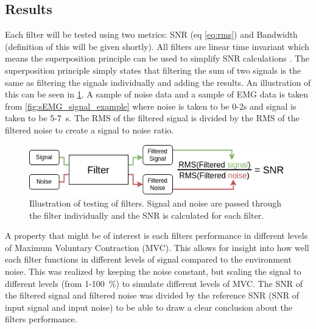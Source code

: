 \subsection{Results}
Each filter will be tested using two metrics: SNR (eq \ref{eq:rms}) and Bandwidth (definition of this will be given shortly). All filters are linear time invariant which means the superposition principle can be used to simplify SNR calculations \cite{linear_systems_theory}. The superposition principle simply states that filtering the sum of two signals is the same as filtering the signals individually and adding the results. An illustration of this can be seen in \ref{fig:filter_process}. A sample of noise data and a sample of EMG data is taken from \ref{fig:sEMG_signal_example} where noise is taken to be 0-2s and signal is taken to be 5-\SI{7}{\second}. The RMS of the filtered signal is divided by the RMS of the filtered noise to create a signal to noise ratio.

\begin{figure}[h!t]
	\begin{center}
		\includegraphics[width=1.0\columnwidth]{images/filter_process.png}
	\end{center}
	\caption{Illustration of testing of filters. Signal and noise are passed through the filter individually and the SNR is calculated for each filter.}
	\label{fig:filter_process}
\end{figure}

A property that might be of interest is each filters performance in different levels of Maximum Voluntary Contraction (MVC). This allows for insight into how well each filter functions in different levels of signal compared to the environment noise. This was realized by keeping the noise constant, but scaling the signal to different levels (from 1-\SI{100}{\percent}) to simulate different levels of MVC. The SNR of the filtered signal and filtered noise was divided by the reference SNR (SNR of input signal and input noise) to be able to draw a clear conclusion about the filters performance.

